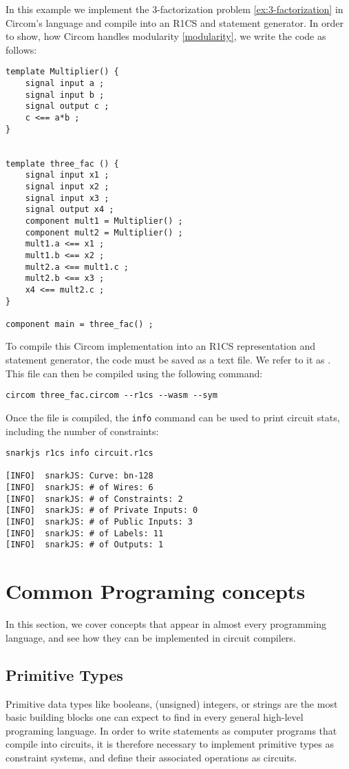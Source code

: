 \begin{example}
\label{ex:3-fac-circom}
In this example we implement the 3-factorization problem \ref{ex:3-factorization} in Circom's language and compile into an R1CS and statement generator. In order to show, how Circom handles modularity \ref{modularity}, we write the code as follows:
\begin{lstlisting}
template Multiplier() {
    signal input a ;
    signal input b ;
    signal output c ;
    c <== a*b ;
}


template three_fac () {
    signal input x1 ;
    signal input x2 ;
    signal input x3 ;
    signal output x4 ;
    component mult1 = Multiplier() ;
    component mult2 = Multiplier() ;
    mult1.a <== x1 ;
    mult1.b <== x2 ;
    mult2.a <== mult1.c ;
    mult2.b <== x3 ;
    x4 <== mult2.c ;
}

component main = three_fac() ;
\end{lstlisting}
To compile this Circom implementation into an R1CS representation and statement generator, the code must be saved as a text file. We refer to it as . This file can then be compiled using the following command:
\begin{lstlisting}
circom three_fac.circom --r1cs --wasm --sym
\end{lstlisting}
Once the file is compiled, the \texttt{info} command can be used to print circuit stats, including the number of constraints:
\begin{lstlisting}
snarkjs r1cs info circuit.r1cs

[INFO]  snarkJS: Curve: bn-128
[INFO]  snarkJS: # of Wires: 6
[INFO]  snarkJS: # of Constraints: 2
[INFO]  snarkJS: # of Private Inputs: 0
[INFO]  snarkJS: # of Public Inputs: 3
[INFO]  snarkJS: # of Labels: 11
[INFO]  snarkJS: # of Outputs: 1
\end{lstlisting}
\end{example}

\section{Common Programing concepts}
In this section, we cover concepts that appear in almost every programming language, and see how they can be implemented in circuit compilers. 
\subsection{Primitive Types} 
Primitive data types like booleans, (unsigned) integers, or strings are the most basic building blocks one can expect to find in every general high-level programing language. In order to write statements as computer programs that compile into circuits, it is therefore necessary to implement primitive types as constraint systems, and define their associated operations as circuits.


